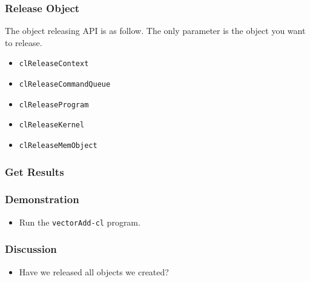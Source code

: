 \documentclass{beamer}
\begin{document}
\begin{frame}
  \frametitle{Release Object} The object releasing API is as
  follow. The only parameter is the object you want to release.
  \begin{itemize}
  \item {\tt clReleaseContext}
  \item {\tt clReleaseCommandQueue}
  \item {\tt clReleaseProgram}
  \item {\tt clReleaseKernel}
  \item {\tt clReleaseMemObject}
  \end{itemize}
\end{frame}

\begin{frame}
  \frametitle{Get Results}
\end{frame}

\begin{frame}
  \frametitle{Demonstration}
  \begin{itemize}
  \item Run the {\tt vectorAdd-cl} program.
  \end{itemize}
\end{frame}

\begin{frame}
  \frametitle{Discussion}
  \begin{itemize}
    \item Have we released all objects we created?
  \end{itemize}
\end{frame}
\end{document}
